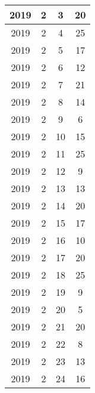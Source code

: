 \begin{longtable} {|c|c|c|c|}
\hline
2019         & 2            & 3            & 20                        \\ 
\hline
2019         & 2            & 4            & 25                        \\ 
\hline
2019         & 2            & 5            & 17                        \\ 
\hline
2019         & 2            & 6            & 12                        \\ 
\hline
2019         & 2            & 7            & 21                        \\ 
\hline
2019         & 2            & 8            & 14                        \\ 
\hline
2019         & 2            & 9            & 6                         \\ 
\hline
2019         & 2            & 10           & 15                        \\ 
\hline
2019         & 2            & 11           & 25                        \\ 
\hline
2019         & 2            & 12           & 9                         \\ 
\hline
2019         & 2            & 13           & 13                        \\ 
\hline
2019         & 2            & 14           & 20                        \\ 
\hline
2019         & 2            & 15           & 17                        \\ 
\hline
2019         & 2            & 16           & 10                        \\ 
\hline
2019         & 2            & 17           & 20                        \\ 
\hline
2019         & 2            & 18           & 25                        \\ 
\hline
2019         & 2            & 19           & 9                         \\ 
\hline
2019         & 2            & 20           & 5                         \\ 
\hline
2019         & 2            & 21           & 20                        \\ 
\hline
2019         & 2            & 22           & 8                         \\ 
\hline
2019         & 2            & 23           & 13                        \\ 
\hline
2019         & 2            & 24           & 16                        \\ 

\end{longtable}
